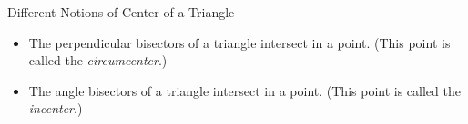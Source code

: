 \begin{exercise}{Different Notions of Center of a Triangle \Coffeecup}
\begin{itemize}
\item The perpendicular bisectors of a triangle intersect in a point.  (This point is called the \emph{circumcenter}.)


\item The angle bisectors of a triangle intersect in a point.  (This point is called the \emph{incenter}.)

\vspace*{2in}

\end{itemize}
\end{exercise}

